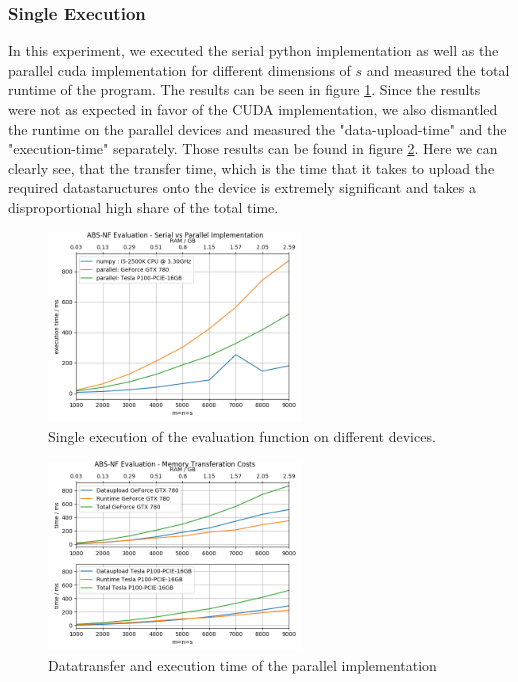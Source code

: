 \subsubsection{Single Execution}

In this experiment, we executed the serial python implementation as well as the parallel cuda implementation for different dimensions of $s$ and measured the total runtime of the program. The results can be seen in figure \ref{eval_single_repetition}. Since the results were not as expected in favor of the CUDA implementation, we also dismantled the runtime on the parallel devices and measured the "data-upload-time" and the "execution-time" separately. Those results can be found in figure \ref{eval_memory}. Here we can clearly see, that the transfer time, which is the time that it takes to upload the required datastaructures onto the device is extremely significant and takes a disproportional high share of the total time.

\begin{figure}[ht]
	\centering
	\includegraphics[width=0.6\textwidth]{img/eval_single_repetition.png}
	\caption{Single execution of the evaluation function on different devices.}
	\label{eval_single_repetition}
\end{figure}

\begin{figure}[ht]
	\centering
	\includegraphics[width=0.6\textwidth]{img/eval_memory.png}
	\caption{Datatransfer and execution time of the parallel implementation}
	\label{eval_memory}
\end{figure}


